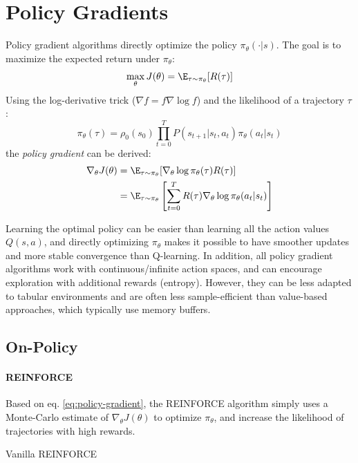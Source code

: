 \section{Policy Gradients}
Policy gradient algorithms directly optimize the policy $\pi_\theta(\cdot | s)$. The goal is to maximize the expected return under $\pi_\theta$:
\[
    \max_\theta J(\theta) = \E_{\tau \sim \pi_\theta} [R(\tau)]
\]
Using the log-derivative trick ($\nabla f = f \nabla \log f$) and the likelihood of a trajectory $\tau$:
\[
    \pi_\theta(\tau) = \rho_0(s_0) \prod_{t=0}^T P(s_{t+1} | s_t, a_t) \pi_\theta(a_t | s_t)
\]
the \emph{policy gradient} can be derived:
\begin{align}
    \nabla_\theta J(\theta) 
    &= \E_{\tau \sim \pi_\theta} [\nabla_\theta \log \pi_\theta(\tau) R(\tau)] \nonumber \\
    &= \E_{\tau \sim \pi_\theta} \left[\sum_{t=0}^T R(\tau) \nabla_\theta \log \pi_\theta(a_t | s_t) \right]
    \label{eq:policy-gradient}
\end{align}


Learning the optimal policy can be easier than learning all the action values $Q(s,a)$, and directly optimizing $\pi_\theta$ makes it possible to have smoother updates and more stable convergence than Q-learning. In addition, all policy gradient algorithms work with continuous/infinite action spaces, and can encourage exploration with additional rewards (entropy). However, they can be less adapted to tabular environments and are often less sample-efficient than value-based approaches, which typically use memory buffers.

\subsection{On-Policy}
\paragraph{REINFORCE}
Based on eq. \ref{eq:policy-gradient}, the REINFORCE algorithm simply uses a Monte-Carlo estimate of $\nabla_\theta J(\theta)$ to optimize $\pi_\theta$, and increase the likelihood of trajectories with high rewards.

\begin{algorithm}[H]
\DontPrintSemicolon
{}
\caption{Vanilla REINFORCE}
\label{algo:reinforce}
\end{algorithm}

